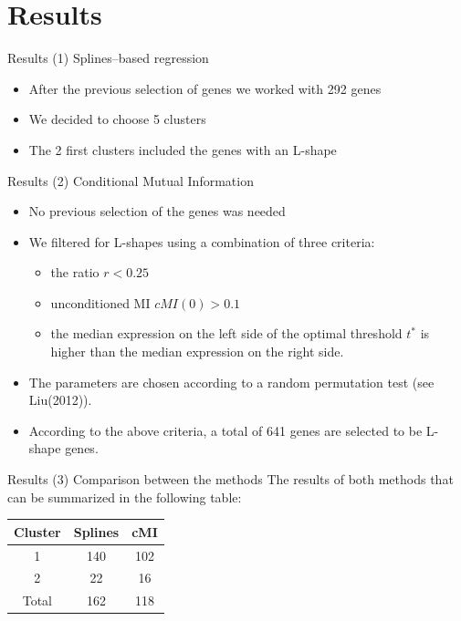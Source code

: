 \documentclass[handout]{beamer}
\begin{document}
\section{Results}

\begin {frame}{Results (1) Splines--based regression}
\begin {itemize}
\item After the previous selection of genes we worked with 292 genes
\item We decided to choose 5 clusters
\item The 2 first clusters included the genes with an L-shape
\end{itemize}
\end{frame}

\begin{frame}{Results (2) Conditional Mutual Information}
\begin {itemize}
\item No previous selection of the genes was needed
\item We filtered for L-shapes using a combination of three criteria:
\begin{itemize}
\item the ratio $r<0.25$
\item unconditioned MI $\mathit{cMI}(0)>0.1$
\item the median expression on the left side of the optimal threshold $t^{\ast}$ is higher
than the median expression on the right side.
\end{itemize}
\item The parameters are chosen according to a random permutation test (see Liu(2012)).
\item According to the above criteria, a total of 641 genes are selected to be L-shape genes.
\end{itemize}
\end{frame}


\begin{frame}{Results (3) Comparison between the methods}
The results of both methods that can be summarized in the following table:
\begin{center}
\begin{tabular}{|c|c|c|}
\hline
Cluster & Splines & cMI \\
\hline
1 & 140 & 102 \\
2 & 22 & 16 \\
\hline
Total & 162 & 118 \\
\hline
\end{tabular}
\end{center}
\end{frame}
\end{document}
